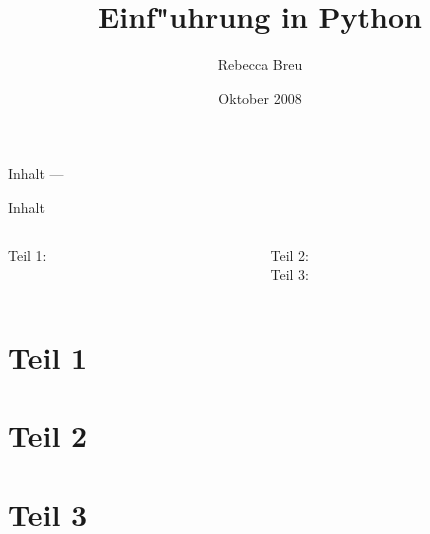 \documentclass{beamer}
\title{Einf"uhrung in Python}
\date{Oktober 2008}
\author{Rebecca Breu}
\institute
{
 Verteilte Systeme und Grid-Computing \\
 JSC\\
 Forschungszentrum J"ulich
}
\begin{document}

\AtBeginPart
{
  \begin{frame}
  \titlepage
  \end{frame}

  \begin{frame}{Inhalt --- \insertpart}
  \tableofcontents
  \end{frame}
}


\AtBeginSection[]
{
   \begin{frame}{\insertsection}
       \tableofcontents[currentsection]
   \end{frame}
}


\begin{frame}
\titlepage
\end{frame}

\begin{frame}{Inhalt}
\begin{columns}[t]

\begin{column}{0.4\textwidth}
  Teil 1:\\[3mm]
  \tableofcontents[part=1]
\end{column}

\begin{column}{0.6\textwidth}
  Teil 2:\\[3mm]
  \tableofcontents[part=2]
  \vspace{7mm}
  Teil 3:\\[3mm]
  \tableofcontents[part=3]
\end{column}

\end{columns}
\end{frame}


\part{Teil 1}









\vielspass

\part{Teil 2}





\vielspass

\part{Teil 3}




\vielspass
\end{document}
